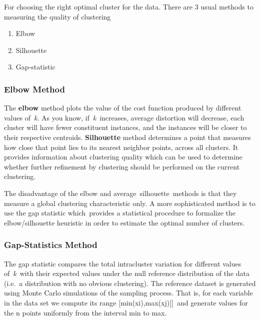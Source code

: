 \documentclass[
]{article}
\begin{document}
For choosing the right optimal cluster for the data. There are 3 usual
methods to measuring the quality of clustering

\begin{enumerate}
\def\labelenumi{\arabic{enumi}.}
\item
  Elbow
\item
  Silhouette
\item
  Gap-statistic
\end{enumerate}

\hypertarget{elbow-method}{%
\subsubsection{Elbow Method}\label{elbow-method}}

The \textbf{elbow} method plots the value of the cost function produced
by different values of~\emph{k}. As you know, if~\emph{k}~increases,
average distortion will decrease, each cluster will have fewer
constituent instances, and the instances will be closer to their
respective centroids. \textbf{Silhouette} method determines a point that
measures how close that point lies to its nearest neighbor points,
across all clusters. It provides information about clustering quality
which can be used to determine whether further refinement by clustering
should be performed on the current clustering.~

The disadvantage of the elbow and average~silhouette~methods is that
they measure a global clustering characteristic only. A more
sophisticated method is to use the gap statistic which~provides a
statistical procedure to formalize the elbow/silhouette heuristic in
order to estimate the optimal number of clusters.

\hypertarget{gap-statistics-method}{%
\subsubsection{Gap-Statistics Method}\label{gap-statistics-method}}

The gap statistic compares the total intracluster variation for
different values of~\emph{k}~with their expected values under the null
reference distribution of the data (i.e.~a distribution with no obvious
clustering). The reference dataset is generated using Monte Carlo
simulations of the sampling process. That is, for each variable in the
data set we compute its range {[}min(xi),max(xj){]}{]}~and generate
values for the n points uniformly from the interval min to max.
\end{document}
